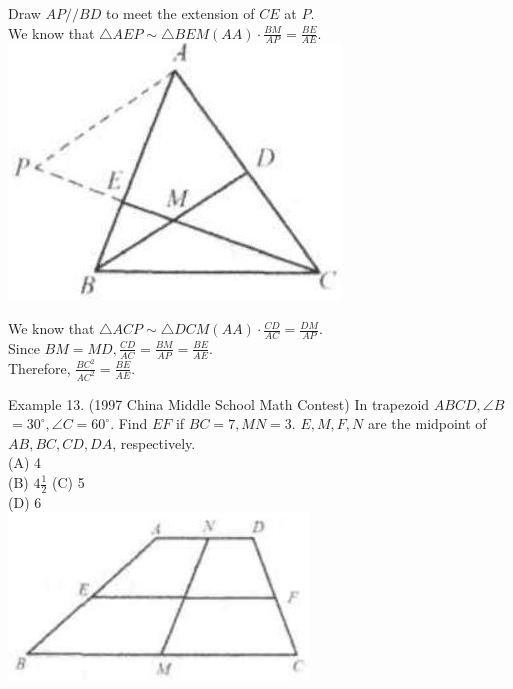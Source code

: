 \documentclass[10pt]{article}
\begin{document}
Draw \(A P / / B D\) to meet the extension of \(C E\) at \(P\).\\
We know that \(\triangle A E P \sim \triangle B E M(A A) \cdot \frac{B M}{A P}=\frac{B E}{A E}\).\\
\includegraphics[max width=\textwidth, center]{2025_04_17_97bc1f7e44d93c271a88g-116}

We know that \(\triangle A C P \sim \triangle D C M(A A) \cdot \frac{C D}{A C}=\frac{D M}{A P}\).\\
Since \(B M=M D, \frac{C D}{A C}=\frac{B M}{A P}=\frac{B E}{A E}\).\\
Therefore, \(\frac{B C^{2}}{A C^{2}}=\frac{B E}{A E}\).

Example 13. (1997 China Middle School Math Contest) In trapezoid \(A B C D, \angle B\) \(=30^{\circ}, \angle C=60^{\circ}\). Find \(E F\) if \(B C=7, M N=3\). \(E, M, F, N\) are the midpoint of \(A B, B C, C D, D A\), respectively.\\
(A) 4\\
(B) \(4 \frac{1}{2}\) (C) 5\\
(D) 6\\
\includegraphics[max width=\textwidth, center]{2025_04_17_97bc1f7e44d93c271a88g-116(2)}
\end{document}
